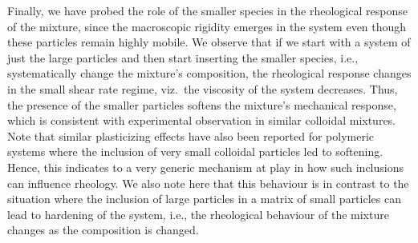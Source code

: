 Finally, we have probed the role of the smaller species in the rheological response of the mixture, since the macroscopic rigidity emerges in the system even though these particles remain highly mobile. We observe that if we start with a system of just the large particles and then start inserting the smaller species, i.e., systematically change the mixture's composition, the rheological response changes in the small shear rate regime, viz.~the viscosity of the system decreases. Thus, the presence of the smaller particles softens the mixture's mechanical response, which is consistent with experimental observation in similar colloidal mixtures. Note that similar plasticizing effects have also been reported for polymeric systems \cite{zaccarelli2005, kalathiprl2012} where the inclusion of very small colloidal particles led to softening. Hence, this indicates to a very generic mechanism at play in how such inclusions can influence rheology.  We also note here that this behaviour is in contrast to the situation where the inclusion of large particles in a matrix of small particles can lead to hardening of the system, i.e., the rheological behaviour of the mixture changes as the composition is changed.
